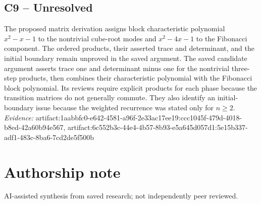 \documentclass[11pt]{article}
\begin{document}
\subsection{C9 -- Unresolved}
The proposed matrix derivation assigns block characteristic polynomial $x^2-x-1$ to the nontrivial cube-root modes and $x^2-4x-1$ to the Fibonacci component. The ordered products, their asserted trace and determinant, and the initial boundary remain unproved in the saved argument.
The saved candidate argument asserts trace one and determinant minus one for the nontrivial three-step products, then combines their characteristic polynomial with the Fibonacci block polynomial. Its reviews require explicit products for each phase because the transition matrices do not generally commute. They also identify an initial-boundary issue because the weighted recurrence was stated only for $n\geq2$.
\textit{Evidence: }artifact:1aabbfc0-e642-4581-a96f-2e33ac17ee19:ccc1045f-479d-4018-b8ed-42a60b94e567, artifact:6c552b3c-44e4-4b57-8b93-e5a645d057d1:5e15b337-adf1-483c-8ba6-7cd2de5f500b
\section*{Authorship note}
AI-assisted synthesis from saved research; not independently peer reviewed.
\end{document}
